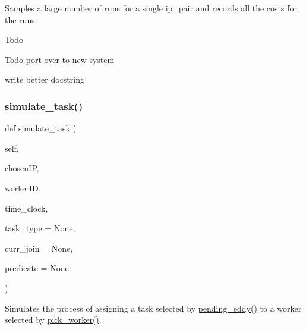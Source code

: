 Samples a large number of runs for a single ip\+\_\+pair and records all the costs for the runs. 

\begin{DoxyRefDesc}{Todo}
\item[\mbox{\hyperlink{todo__todo000004}{Todo}}]port over to new system 

write better docstring \end{DoxyRefDesc}
\mbox{\label{classdynamicfilterapp_1_1test__simulations_1_1_simulation_test_a8bed8f0f57234f8356ce3bc19606c6bf}} 
\subsubsection{\texorpdfstring{simulate\_task()}{simulate\_task()}}
{\footnotesize\ttfamily def simulate\+\_\+task (\begin{DoxyParamCaption}\item[{}]{self,  }\item[{}]{chosen\+IP,  }\item[{}]{worker\+ID,  }\item[{}]{time\+\_\+clock,  }\item[{}]{task\+\_\+type = {\ttfamily None},  }\item[{}]{curr\+\_\+join = {\ttfamily None},  }\item[{}]{predicate = {\ttfamily None} }\end{DoxyParamCaption})}



Simulates the process of assigning a task selected by \mbox{\hyperlink{namespacedynamicfilterapp_1_1views__helpers_ad11bcb9737901ab723493b4f7fe09329}{pending\+\_\+eddy()}} to a worker selected by \mbox{\hyperlink{classdynamicfilterapp_1_1test__simulations_1_1_simulation_test_acb17139f8e2f7a4b835ec1c05400e8c2}{pick\+\_\+worker()}}. 


